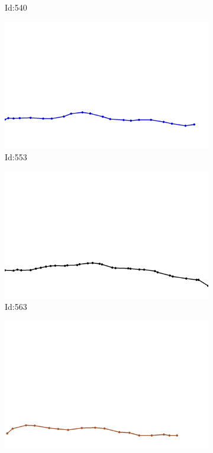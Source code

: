 \documentclass[12pt,twoside]{report}
\begin{document}
\begin{figure}
\begin{subfigure}[b]{0.20\textwidth}
\caption{Id:540}
\end{subfigure}
\begin{subfigure}[b]{0.20\textwidth}
\centering
\includegraphics[width=\textwidth]{../../trajectories/553.png}
\caption{Id:553}
\end{subfigure}
\begin{subfigure}[b]{0.20\textwidth}
\centering
\includegraphics[width=\textwidth]{../../trajectories/563.png}
\caption{Id:563}
\end{subfigure}
\begin{subfigure}[b]{0.20\textwidth}
\centering
\includegraphics[width=\textwidth]{../../trajectories/656.png}

\end{subfigure}
\end{figure}
\end{document}
